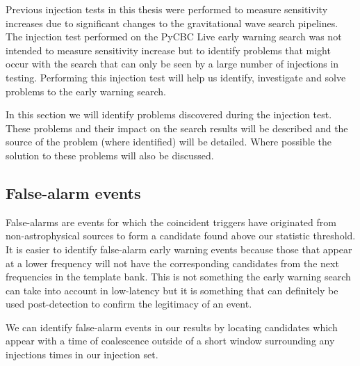Previous injection tests in this thesis were performed to measure sensitivity increases due to significant changes to the gravitational wave search pipelines. The injection test performed on the PyCBC Live early warning search was not intended to measure sensitivity increase but to identify problems that might occur with the search that can only be seen by a large number of injections in testing. Performing this injection test will help us identify, investigate and solve problems to the early warning search.

In this section we will identify problems discovered during the injection test. These problems and their impact on the search results will be described and the source of the problem (where identified) will be detailed. Where possible the solution to these problems will also be discussed.

\subsection{\label{6:sec:false-alarms}False-alarm events}

False-alarms are events for which the coincident triggers have originated from non-astrophysical sources to form a candidate found above our statistic threshold. It is easier to identify false-alarm early warning events because those that appear at a lower frequency will not have the corresponding candidates from the next frequencies in the template bank. This is not something the early warning search can take into account in low-latency but it is something that can definitely be used post-detection to confirm the legitimacy of an event.

We can identify false-alarm events in our results by locating candidates which appear with a time of coalescence outside of a short window surrounding any injections times in our injection set.

